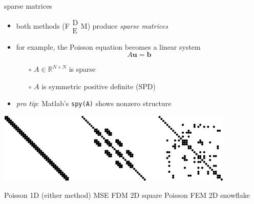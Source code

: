 \documentclass[hide notes,intlimits,usenames,dvipsnames]{beamer}
\newcommand{\RR}{\mathbb{R}}
\newcommand{\bb}{\mathbf{b}}
\newcommand{\bu}{\mathbf{u}}
\newcommand{\FM}{F$\begin{smallmatrix} \text{D} \\ \text{E} \end{smallmatrix}$M\xspace}
\begin{document}
\begin{frame}{sparse matrices}
\begin{itemize}
\item both methods (\FM) produce \emph{sparse matrices}
\item for example, the Poisson equation becomes a linear system
    $$A \bu = \bb$$
    \vspace{-4mm}
	\begin{itemize}
	\item[$\circ$] $A\in\RR^{N\times N}$ is sparse
	\item[$\circ$] $A$ is symmetric positive definite (SPD)
	\end{itemize}
\item \emph{pro tip}: Matlab's \texttt{spy(A)} shows nonzero structure
\end{itemize}

\bigskip
\begin{center}
\includegraphics[width=0.85\textwidth]{figs/spythree}

\medskip
\scriptsize
Poisson 1D (either method) \quad MSE FDM 2D square \qquad Poisson FEM 2D snowflake

\end{center}
\end{frame}
\end{document}
